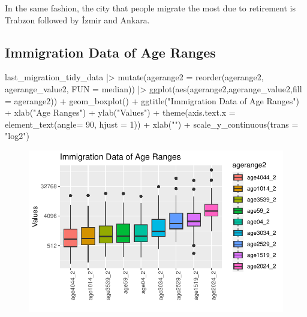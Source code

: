 \documentclass[
  11pt,
  a4paper,
  DIV=11,
  numbers=noendperiod]{scrartcl}
\newenvironment{Shaded}{\begin{snugshade}}{\end{snugshade}}
\newcommand{\AttributeTok}[1]{\textcolor[rgb]{0.40,0.45,0.13}{#1}}
\newcommand{\DecValTok}[1]{\textcolor[rgb]{0.68,0.00,0.00}{#1}}
\newcommand{\FunctionTok}[1]{\textcolor[rgb]{0.28,0.35,0.67}{#1}}
\newcommand{\NormalTok}[1]{\textcolor[rgb]{0.00,0.23,0.31}{#1}}
\newcommand{\SpecialCharTok}[1]{\textcolor[rgb]{0.37,0.37,0.37}{#1}}
\newcommand{\StringTok}[1]{\textcolor[rgb]{0.13,0.47,0.30}{#1}}
\begin{document}
In the same fashion, the city that people migrate the most due to
retirement is Trabzon followed by İzmir and Ankara.

\hypertarget{immigration-data-of-age-ranges}{%
\subsection{Immigration Data of Age
Ranges}\label{immigration-data-of-age-ranges}}

\begin{Shaded}
\begin{Highlighting}[]
\NormalTok{last\_migration\_tidy\_data }\SpecialCharTok{|\textgreater{}} \FunctionTok{mutate}\NormalTok{(}\AttributeTok{agerange2 =} \FunctionTok{reorder}\NormalTok{(agerange2, agerange\_value2, }\AttributeTok{FUN =}\NormalTok{ median)) }\SpecialCharTok{|\textgreater{}}
  \FunctionTok{ggplot}\NormalTok{(}\FunctionTok{aes}\NormalTok{(agerange2,agerange\_value2,}\AttributeTok{fill =}\NormalTok{ agerange2)) }\SpecialCharTok{+}
  \FunctionTok{geom\_boxplot}\NormalTok{() }\SpecialCharTok{+} \FunctionTok{ggtitle}\NormalTok{(}\StringTok{"Immigration Data of Age Ranges"}\NormalTok{) }\SpecialCharTok{+} \FunctionTok{xlab}\NormalTok{(}\StringTok{"Age Ranges"}\NormalTok{) }\SpecialCharTok{+}
  \FunctionTok{ylab}\NormalTok{(}\StringTok{"Values"}\NormalTok{) }\SpecialCharTok{+} \FunctionTok{theme}\NormalTok{(}\AttributeTok{axis.text.x =} \FunctionTok{element\_text}\NormalTok{(}\AttributeTok{angle=} \DecValTok{90}\NormalTok{, }\AttributeTok{hjust =} \DecValTok{1}\NormalTok{)) }\SpecialCharTok{+} \FunctionTok{xlab}\NormalTok{(}\StringTok{""}\NormalTok{) }\SpecialCharTok{+}
  \FunctionTok{scale\_y\_continuous}\NormalTok{(}\AttributeTok{trans =} \StringTok{"log2"}\NormalTok{) }
\end{Highlighting}
\end{Shaded}

\begin{figure}[H]

{\centering \includegraphics{analysis_files/figure-pdf/unnamed-chunk-7-1.pdf}

}

\end{figure}
\end{document}

